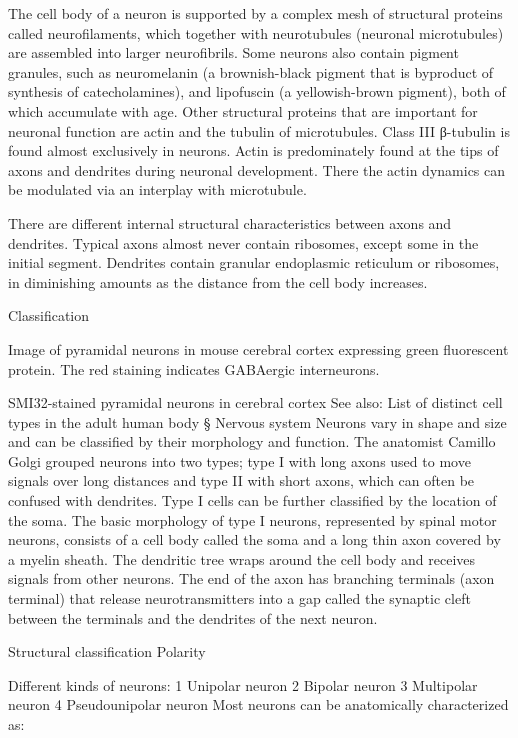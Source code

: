 \documentclass[]{book}
\begin{document}
The cell body of a neuron is supported by a complex mesh of structural proteins called neurofilaments, which together with neurotubules (neuronal microtubules) are assembled into larger neurofibrils. Some neurons also contain pigment granules, such as neuromelanin (a brownish-black pigment that is byproduct of synthesis of catecholamines), and lipofuscin (a yellowish-brown pigment), both of which accumulate with age. Other structural proteins that are important for neuronal function are actin and the tubulin of microtubules. Class III β-tubulin is found almost exclusively in neurons. Actin is predominately found at the tips of axons and dendrites during neuronal development. There the actin dynamics can be modulated via an interplay with microtubule.

There are different internal structural characteristics between axons and dendrites. Typical axons almost never contain ribosomes, except some in the initial segment. Dendrites contain granular endoplasmic reticulum or ribosomes, in diminishing amounts as the distance from the cell body increases.

Classification

Image of pyramidal neurons in mouse cerebral cortex expressing green fluorescent protein. The red staining indicates GABAergic interneurons.

SMI32-stained pyramidal neurons in cerebral cortex
See also: List of distinct cell types in the adult human body § Nervous system
Neurons vary in shape and size and can be classified by their morphology and function. The anatomist Camillo Golgi grouped neurons into two types; type I with long axons used to move signals over long distances and type II with short axons, which can often be confused with dendrites. Type I cells can be further classified by the location of the soma. The basic morphology of type I neurons, represented by spinal motor neurons, consists of a cell body called the soma and a long thin axon covered by a myelin sheath. The dendritic tree wraps around the cell body and receives signals from other neurons. The end of the axon has branching terminals (axon terminal) that release neurotransmitters into a gap called the synaptic cleft between the terminals and the dendrites of the next neuron.

Structural classification
Polarity

Different kinds of neurons:
1 Unipolar neuron
2 Bipolar neuron
3 Multipolar neuron
4 Pseudounipolar neuron
Most neurons can be anatomically characterized as:
\end{document}
